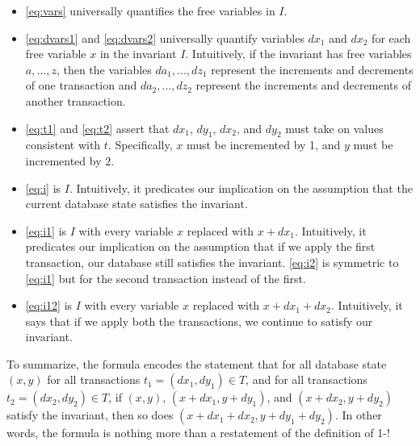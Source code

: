 \begin{itemize}
  \item
    \eqref{eq:vars} universally quantifies the free variables in $I$.

  \item
    \eqref{eq:dvars1} and \eqref{eq:dvars2} universally quantify variables
    $dx_1$ and $dx_2$ for each free variable $x$ in the invariant $I$.
    Intuitively, if the invariant has free variables $a, \ldots, z$, then the
    variables $da_1, \ldots, dz_1$ represent the increments and decrements of
    one transaction and $da_2, \ldots, dz_2$ represent the increments and
    decrements of another transaction.

  \item
    \eqref{eq:t1} and \eqref{eq:t2} assert that $dx_1$, $dy_1$, $dx_2$, and
    $dy_2$ must take on values consistent with $t$. Specifically, $x$ must be
    incremented by 1, and $y$ must be incremented by $2$.

  \item
    \eqref{eq:i} is $I$. Intuitively, it predicates our implication on the
    assumption that the current database state satisfies the invariant.

  \item
    \eqref{eq:i1} is $I$ with every variable $x$ replaced with $x + dx_1$.
    Intuitively, it predicates our implication on the assumption that if we
    apply the first transaction, our database still satisfies the invariant.
    \eqref{eq:i2} is symmetric to \eqref{eq:i1} but for the second transaction
    instead of the first.

  \item
    \eqref{eq:i12} is $I$ with every variable $x$ replaced with $x + dx_1 +
    dx_2$. Intuitively, it says that if we apply both the transactions, we
    continue to satisfy our invariant.
\end{itemize}

To summarize, the formula encodes the statement that for all database state
$(x, y)$ for all transactions $t_1 = (dx_1, dy_1) \in T$, and for all
transactions $t_2 = (dx_2, dy_2) \in T$, if $(x, y)$, $(x + dx_1, y + dy_1)$,
and $(x + dx_2, y + dy_2)$ satisfy the invariant, then so does $(x + dx_1 +
dx_2, y + dy_1 + dy_2)$. In other words, the formula is nothing more than a
restatement of the definition of 1-\iconfluence!
